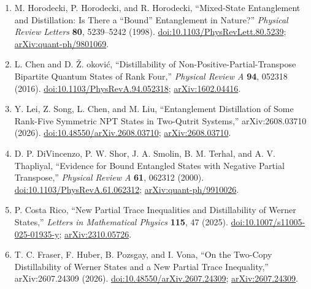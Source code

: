 \begin{enumerate}[label={},leftmargin=4.8em,labelsep=0.5em]
  \footnotesize
  \item[\textup{[HHH98]}]\label{ref:p10-horodecki}
  M. Horodecki, P. Horodecki, and R. Horodecki,
  ``Mixed-State Entanglement and Distillation: Is There a ``Bound''
  Entanglement in Nature?''
  \emph{Physical Review Letters} \textbf{80}, 5239--5242 (1998).
  \href{https://doi.org/10.1103/PhysRevLett.80.5239}{doi:10.1103/PhysRevLett.80.5239};
  \href{https://arxiv.org/abs/quant-ph/9801069}{arXiv:quant-ph/9801069}.

  \item[\textup{[CD16]}]\label{ref:p10-chen-djokovic}
  L. Chen and D. \v{Z}. \DJ okovi\'c,
  ``Distillability of Non-Positive-Partial-Transpose Bipartite Quantum States
  of Rank Four,'' \emph{Physical Review A} \textbf{94}, 052318 (2016).
  \href{https://doi.org/10.1103/PhysRevA.94.052318}{doi:10.1103/PhysRevA.94.052318};
  \href{https://arxiv.org/abs/1602.04416}{arXiv:1602.04416}.

  \item[\textup{[LSC+26]}]\label{ref:p10-lei-et-al}
  Y. Lei, Z. Song, L. Chen, and M. Liu,
  ``Entanglement Distillation of Some Rank-Five Symmetric NPT States in
  Two-Qutrit Systems,'' arXiv:2608.03710 (2026).
  \href{https://doi.org/10.48550/arXiv.2608.03710}{doi:10.48550/arXiv.2608.03710};
  \href{https://arxiv.org/abs/2608.03710}{arXiv:2608.03710}.

  \item[\textup{[DSS+00]}]\label{ref:p10-divincenzo-et-al}
  D. P. DiVincenzo, P. W. Shor, J. A. Smolin, B. M. Terhal, and
  A. V. Thapliyal,
  ``Evidence for Bound Entangled States with Negative Partial Transpose,''
  \emph{Physical Review A} \textbf{61}, 062312 (2000).
  \href{https://doi.org/10.1103/PhysRevA.61.062312}{doi:10.1103/PhysRevA.61.062312};
  \href{https://arxiv.org/abs/quant-ph/9910026}{arXiv:quant-ph/9910026}.

  \item[\textup{[CR25]}]\label{ref:p10-costa-rico}
  P. Costa Rico,
  ``New Partial Trace Inequalities and Distillability of Werner States,''
  \emph{Letters in Mathematical Physics} \textbf{115}, 47 (2025).
  \href{https://doi.org/10.1007/s11005-025-01935-y}{doi:10.1007/s11005-025-01935-y};
  \href{https://arxiv.org/abs/2310.05726}{arXiv:2310.05726}.

  \item[\textup{[FHPV26]}]\label{ref:p10-fraser-et-al}
  T. C. Fraser, F. Huber, B. Pozsgay, and I. Vona,
  ``On the Two-Copy Distillability of Werner States and a New Partial Trace
  Inequality,'' arXiv:2607.24309 (2026).
  \href{https://doi.org/10.48550/arXiv.2607.24309}{doi:10.48550/arXiv.2607.24309};
  \href{https://arxiv.org/abs/2607.24309}{arXiv:2607.24309}.


\end{enumerate}

